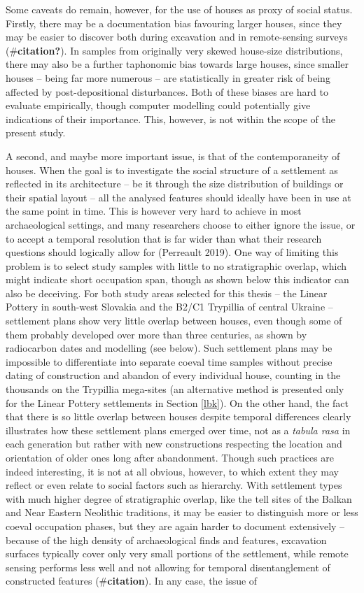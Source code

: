 \documentclass[
  12pt,
  a4paper, twoside]{book}
\begin{document}
Some caveats do remain, however, for the use of houses as proxy of social status. Firstly, there may be a documentation bias favouring larger houses, since they may be easier to discover both during excavation and in remote-sensing surveys (\#\textbf{citation?}). In samples from originally very skewed house-size distributions, there may also be a further taphonomic bias towards large houses, since smaller houses -- being far more numerous -- are statistically in greater risk of being affected by post-depositional disturbances. Both of these biases are hard to evaluate empirically, though computer modelling could potentially give indications of their importance. This, however, is not within the scope of the present study.

A second, and maybe more important issue, is that of the contemporaneity of houses. When the goal is to investigate the social structure of a settlement as reflected in its architecture -- be it through the size distribution of buildings or their spatial layout -- all the analysed features should ideally have been in use at the same point in time. This is however very hard to achieve in most archaeological settings, and many researchers choose to either ignore the issue, or to accept a temporal resolution that is far wider than what their research questions should logically allow for (Perreault 2019). One way of limiting this problem is to select study samples with little to no stratigraphic overlap, which might indicate short occupation span, though as shown below this indicator can also be deceiving. For both study areas selected for this thesis -- the Linear Pottery in south-west Slovakia and the B2/C1 Trypillia of central Ukraine -- settlement plans show very little overlap between houses, even though some of them probably developed over more than three centuries, as shown by radiocarbon dates and modelling (see below). Such settlement plans may be impossible to differentiate into separate coeval time samples without precise dating of construction and abandon of every individual house, counting in the thousands on the Trypillia mega-sites (an alternative method is presented only for the Linear Pottery settlements in Section \ref{lbk}). On the other hand, the fact that there is so little overlap between houses despite temporal differences clearly illustrates how these settlement plans emerged over time, not as a \emph{tabula rasa} in each generation but rather with new constructions respecting the location and orientation of older ones long after abandonment. Though such practices are indeed interesting, it is not at all obvious, however, to which extent they may reflect or even relate to social factors such as hierarchy. With settlement types with much higher degree of stratigraphic overlap, like the tell sites of the Balkan and Near Eastern Neolithic traditions, it may be easier to distinguish more or less coeval occupation phases, but they are again harder to document extensively -- because of the high density of archaeological finds and features, excavation surfaces typically cover only very small portions of the settlement, while remote sensing performs less well and not allowing for temporal disentanglement of constructed features (\#\textbf{citation}). In any case, the issue of 
\end{document}
